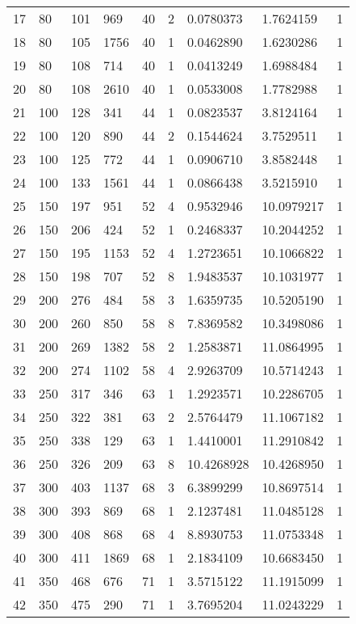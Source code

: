 \begin{longtable}{lllllllll}
  17 & 80 & 101 & 969 & 40 & 2 & 0.0780373 & 1.7624159 & 1 \\
  18 & 80 & 105 & 1756 & 40 & 1 & 0.0462890 & 1.6230286 & 1 \\
  19 & 80 & 108 & 714 & 40 & 1 & 0.0413249 & 1.6988484 & 1 \\
  20 & 80 & 108 & 2610 & 40 & 1 & 0.0533008 & 1.7782988 & 1 \\
  21 & 100 & 128 & 341 & 44 & 1 & 0.0823537 & 3.8124164 & 1 \\
  22 & 100 & 120 & 890 & 44 & 2 & 0.1544624 & 3.7529511 & 1 \\
  23 & 100 & 125 & 772 & 44 & 1 & 0.0906710 & 3.8582448 & 1 \\
  24 & 100 & 133 & 1561 & 44 & 1 & 0.0866438 & 3.5215910 & 1 \\
  25 & 150 & 197 & 951 & 52 & 4 & 0.9532946 & 10.0979217 & 1 \\
  26 & 150 & 206 & 424 & 52 & 1 & 0.2468337 & 10.2044252 & 1 \\
  27 & 150 & 195 & 1153 & 52 & 4 & 1.2723651 & 10.1066822 & 1 \\
  28 & 150 & 198 & 707 & 52 & 8 & 1.9483537 & 10.1031977 & 1 \\
  29 & 200 & 276 & 484 & 58 & 3 & 1.6359735 & 10.5205190 & 1 \\
  30 & 200 & 260 & 850 & 58 & 8 & 7.8369582 & 10.3498086 & 1 \\
  31 & 200 & 269 & 1382 & 58 & 2 & 1.2583871 & 11.0864995 & 1 \\
  32 & 200 & 274 & 1102 & 58 & 4 & 2.9263709 & 10.5714243 & 1 \\
  33 & 250 & 317 & 346 & 63 & 1 & 1.2923571 & 10.2286705 & 1 \\
  34 & 250 & 322 & 381 & 63 & 2 & 2.5764479 & 11.1067182 & 1 \\
  35 & 250 & 338 & 129 & 63 & 1 & 1.4410001 & 11.2910842 & 1 \\
  36 & 250 & 326 & 209 & 63 & 8 & 10.4268928 & 10.4268950 & 1 \\
  37 & 300 & 403 & 1137 & 68 & 3 & 6.3899299 & 10.8697514 & 1 \\
  38 & 300 & 393 & 869 & 68 & 1 & 2.1237481 & 11.0485128 & 1 \\
  39 & 300 & 408 & 868 & 68 & 4 & 8.8930753 & 11.0753348 & 1 \\
  40 & 300 & 411 & 1869 & 68 & 1 & 2.1834109 & 10.6683450 & 1 \\
  41 & 350 & 468 & 676 & 71 & 1 & 3.5715122 & 11.1915099 & 1 \\
  42 & 350 & 475 & 290 & 71 & 1 & 3.7695204 & 11.0243229 & 1 \\

\end{longtable}
